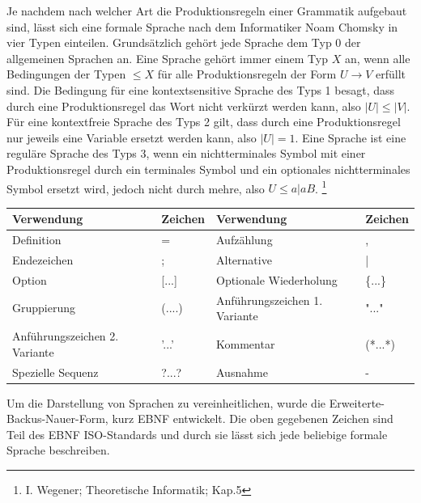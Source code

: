 Je nachdem nach welcher Art die Produktionsregeln einer Grammatik aufgebaut sind, lässt sich eine formale Sprache nach dem Informatiker Noam Chomsky in vier Typen einteilen. Grundsätzlich gehört jede Sprache dem Typ 0 der allgemeinen Sprachen an. Eine Sprache gehört immer einem Typ $X$ an, wenn alle Bedingungen  der Typen $\leq X$ für alle Produktionsregeln der Form $U \rightarrow V$ erfüllt sind. Die Bedingung für eine kontextsensitive Sprache des Typs 1 besagt, dass durch eine Produktionsregel das Wort nicht verkürzt werden kann, also $|U| \leq |V|$. Für eine kontextfreie Sprache des Typs 2 gilt, dass durch eine Produktionsregel nur jeweils eine Variable ersetzt werden kann, also $|U| = 1$. Eine Sprache ist eine reguläre Sprache des Typs 3, wenn ein nichtterminales Symbol mit einer Produktionsregel durch ein terminales Symbol und ein optionales nichtterminales Symbol ersetzt wird, jedoch nicht durch mehre, also $U \leq a|aB$. \footnote{I. Wegener;	Theoretische Informatik; Kap.5}\\
\begin{table}[h!]
\begin{tabular}{|ll|ll|}
\hline
Verwendung                    & Zeichen   & Verwendung                    & Zeichen \\ \hline
Definition                    & =         & Aufzählung                    & ,       \\
Endezeichen                   & ;         & Alternative                   & |       \\
Option                        & {[}...{]} & Optionale Wiederholung        & \{...\} \\
Gruppierung                   & (....)    & Anführungszeichen 1. Variante & "..."   \\
Anführungszeichen 2. Variante & '...'     & Kommentar                      & (*...*) \\
Spezielle Sequenz             & ?...?     & Ausnahme                      & -       \\ \hline
\end{tabular}
\end{table}
Um die Darstellung von Sprachen zu vereinheitlichen, wurde die Erweiterte-Backus-Nauer-Form, kurz EBNF entwickelt. Die oben gegebenen Zeichen sind Teil des EBNF ISO-Standards und durch sie lässt sich jede beliebige formale Sprache beschreiben.\\

 

